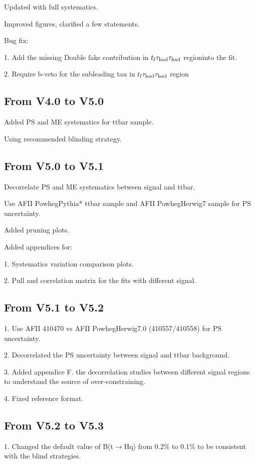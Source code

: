 Updated with full systematics.

Improved figures, clarified a few statements.

Bug fix:

1. Add the missing Double fake contribution in $t_l\tau_\text{had}\tau_\text{had}$ regioninto the fit.

2. Require b-veto for the subleading tau in $t_l\tau_\text{had}\tau_\text{had}$ region

\subsection{From V4.0 to V5.0}

Added PS and ME systematics for ttbar sample.

Using recommended blinding strategy.

\subsection{From V5.0 to V5.1}

Decorrelate PS and ME systematics between signal and ttbar.

Use AFII PowhegPythia* ttbar sample and AFII PowhegHerwig7 sample for PS uncertainty.

Added pruning plots.

Added appendices for:

1. Systematics variation comparison plots.

2. Pull and correlation matrix for the fits with different signal.

\subsection{From V5.1 to V5.2}

1. Use AFII 410470 vs AFII PowhegHerwig7.0 (410557/410558) for PS uncertainty.

2. Decorrelated the PS uncertainty between signal and ttbar background.

3. Added appendice F. the decorrelation studies between different signal regions to understand the source of over-constraining.

4. Fixed reference format.

\subsection{From V5.2 to V5.3}

1. Changed the default value of B(t$\rightarrow$Hq) from 0.2\% to 0.1\% to be consistent with the blind strategies.


